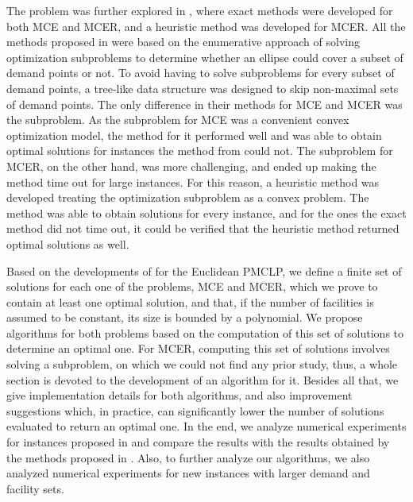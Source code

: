 The problem was further explored in , where exact methods were developed for both MCE and MCER, and a heuristic method was developed for MCER.
All the methods proposed in \cite{andreta} were based on the enumerative approach of solving optimization subproblems to determine whether an ellipse could cover a subset of demand points or not. To avoid having to solve subproblems for every subset of demand points, a tree-like data structure was designed to skip non-maximal sets of demand points.
The only difference in their methods for MCE and MCER was the subproblem.
As the subproblem for MCE was a convenient convex optimization model, the method for it performed well and  was able to obtain optimal solutions for instances the method from \cite{canbolat} could not.
The subproblem for MCER, on the other hand, was more challenging, and ended up making the method time out for large instances. For this reason, a heuristic method was developed treating the optimization subproblem as a convex problem. The method was able to obtain solutions for every instance, and for the ones the exact method did not time out, it could be verified that the heuristic method returned optimal {\color{blue}solutions} as well.

Based on the developments of \cite{church:1984} for the Euclidean PMCLP, we define a finite set of solutions for each one of the problems, MCE and MCER, which we prove to contain at least one optimal solution, and that, if the number of facilities is assumed to be constant, its size is bounded by a polynomial.
We propose algorithms for both problems based on the computation of this set of solutions to determine an optimal one.
For MCER, computing this set of solutions involves solving a subproblem, on which we could not find any prior study, thus, a whole section is devoted to the development of an algorithm for it.
Besides all that, we give implementation details for both algorithms, and also improvement suggestions which, in practice, can significantly lower the number of solutions evaluated to return an optimal one.
In the end, we analyze numerical experiments for instances proposed in \cite{canbolat, andreta} and compare the results with the results obtained by the methods proposed in \cite{andreta}. Also, to further analyze our algorithms, we also analyzed numerical experiments for new instances with larger demand and facility sets.